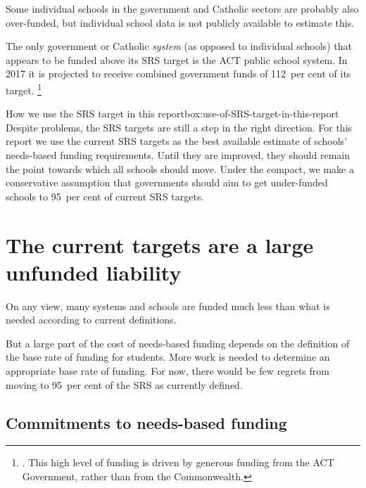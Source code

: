 \documentclass{grattan}
\begin{document}
\pagebreak[4]

Some individual schools in the government and Catholic sectors are probably also over-funded, but individual school data is not publicly available to estimate this.

The only government or Catholic \emph{system} (as opposed to individual schools) that appears to be funded above its SRS target is the ACT public school system.
In 2017 it is projected to receive combined government funds of 112~per cent of its target.%
\footnote{\textcite{SenateSQ15000244}.
This high level of funding is driven by generous funding from the ACT Government, rather than from the Commonwealth.}

\begin{pagesmallbox}{How we use the SRS target in this report}{box:use-of-SRS-target-in-this-report}
Despite problems, the SRS targets are still a step in the right direction. For this report we use the current SRS targets as the best available estimate of schools' needs-based funding requirements. Until they are improved, they should remain the point towards which all schools should move.
Under the compact, we make a conservative assumption that governments should aim to get under-funded schools to 95~per cent of current SRS targets.
\end{pagesmallbox}

\section{The current targets are a large unfunded liability}\label{sec:needs-based-funding-is-now-a-large-unfunded-liability}

On any view, many systems and schools are funded much less than what is needed according to current definitions.

But a large part of the cost of needs-based funding depends on the definition of the base rate of funding for students.
More work is needed to determine an appropriate base rate of funding.
For now, there would be few regrets from moving to 95~per cent of the SRS as currently defined.

\subsection{Commitments to needs-based funding}\label{subsec:commitments-to-needs-based-funding}
\end{document}
